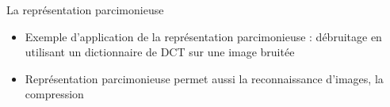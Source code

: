 \begin{frame}{La représentation parcimonieuse}
\begin{itemize}
\item Exemple d'application de la représentation parcimonieuse : \alert{débruitage} en utilisant un dictionnaire de DCT sur une image bruitée
	\begin{figure}\centering
	\end{figure}
\item Représentation parcimonieuse permet aussi la \alert{reconnaissance d'images}, la \alert{compression}
\end{itemize}
\end{frame}


